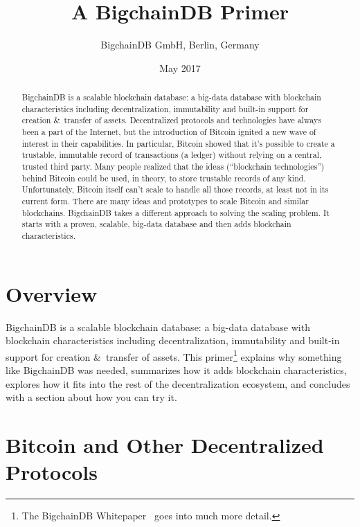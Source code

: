 \documentclass[a4paper]{article}
\title{A BigchainDB Primer}
\author{BigchainDB GmbH, Berlin, Germany}
\date{May 2017}
\begin{document}
\maketitle

\begin{abstract}
BigchainDB is a scalable blockchain database:
a big-data database with blockchain characteristics
including decentralization, immutability and
built-in support for creation \&~transfer of assets.
Decentralized protocols and technologies have always been a part of the Internet,
but the introduction of Bitcoin ignited a new wave of interest in their capabilities.
In particular, Bitcoin showed that it's possible to create a trustable, immutable
record of transactions (a ledger) without relying on a central, trusted third party.
Many people realized that the ideas (``blockchain technologies'') behind Bitcoin
could be used, in theory, to store trustable records of any kind.
Unfortunately, Bitcoin itself can't scale to handle all those records,
at least not in its current form.
There are many ideas and prototypes to scale Bitcoin and similar blockchains.
BigchainDB takes a different approach to solving the scaling problem.
It starts with a proven, scalable, big-data database and
then adds blockchain characteristics.
\end{abstract}


\section{Overview}

BigchainDB is a scalable blockchain database:
a big-data database with blockchain characteristics
including decentralization, immutability and
built-in support for creation \&~transfer of assets.
This primer\footnote{The
BigchainDB Whitepaper~\cite{bigchaindb_whitepaper}
goes into much more detail.}
explains why something like BigchainDB was needed,
summarizes how it adds blockchain characteristics,
explores how it fits into the rest of the decentralization ecosystem,
and concludes with a section about how you can try it.


\section{Bitcoin and Other Decentralized Protocols}
\end{document}
